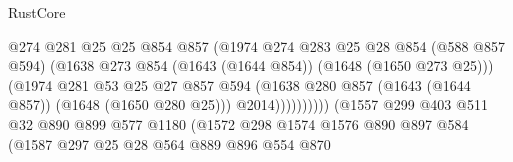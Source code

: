 \begin{lexlean}{RustCore}
\begin{coremodule}
                                            @274
                                            @281
                                            @25
                                            @25
                                            @854
                                            @857
                                            (@1974
                                              @274
                                              @283
                                              @25
                                              @28
                                              @854
                                              (@588 @857 @594)
                                              (@1638
                                                @273
                                                @854
                                                (@1643 (@1644 @854))
                                                (@1648 (@1650 @273 @25)))
                                              (@1974
                                                @281
                                                @53
                                                @25
                                                @27
                                                @857
                                                @594
                                                (@1638
                                                  @280
                                                  @857
                                                  (@1643 (@1644 @857))
                                                  (@1648 (@1650 @280 @25)))
                                                @2014))))))))))
                            (@1557
                              @299
                              @403
                              @511
                              @32
                              @890
                              @899
                              @577
                              @1180
                              (@1572
                                @298
                                @1574
                                @1576
                                @890
                                @897
                                @584
                                (@1587
                                  @297
                                  @25
                                  @28
                                  @564
                                  @889
                                  @896
                                  @554
                                  @870

\end{coremodule}
\end{lexlean}

